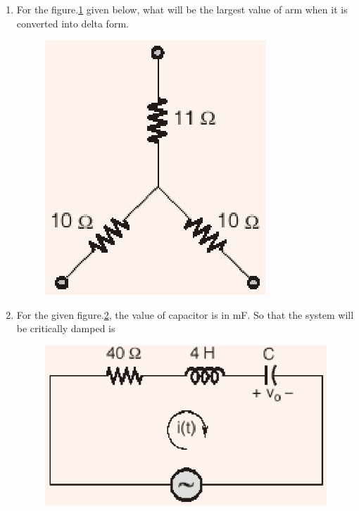 \documentclass[journal,12pt,twocolumn]{IEEEtran}
\begin{document}
\begin{enumerate}
 
\item For the figure.\ref{fig96} given below, what will be the largest value of arm when it is
converted into delta form.
\begin{figure}[!h]
\begin{center}
\includegraphics[scale=0.7]{./figs/fig96.eps}
\caption{}
\label{fig96}
\end{center}
\end{figure}

\item For the given figure.\ref{fig97}, the value of capacitor is in mF. So that the system will
be critically damped is
\begin{figure}[!h]
\begin{center}
\includegraphics[scale=0.7]{./figs/fig97.eps}
\caption{}
\label{fig97}
\end{center}
\end{figure}


\end{enumerate}
\end{document}
